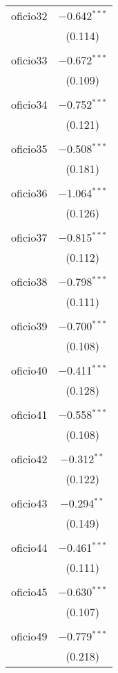 \begin{table}[!htbp]
\begin{tabular}{@{\extracolsep{5pt}}lc}
 oficio32 & $-$0.642$^{***}$ \\ 
  & (0.114) \\ 
  & \\ 
 oficio33 & $-$0.672$^{***}$ \\ 
  & (0.109) \\ 
  & \\ 
 oficio34 & $-$0.752$^{***}$ \\ 
  & (0.121) \\ 
  & \\ 
 oficio35 & $-$0.508$^{***}$ \\ 
  & (0.181) \\ 
  & \\ 
 oficio36 & $-$1.064$^{***}$ \\ 
  & (0.126) \\ 
  & \\ 
 oficio37 & $-$0.815$^{***}$ \\ 
  & (0.112) \\ 
  & \\ 
 oficio38 & $-$0.798$^{***}$ \\ 
  & (0.111) \\ 
  & \\ 
 oficio39 & $-$0.700$^{***}$ \\ 
  & (0.108) \\ 
  & \\ 
 oficio40 & $-$0.411$^{***}$ \\ 
  & (0.128) \\ 
  & \\ 
 oficio41 & $-$0.558$^{***}$ \\ 
  & (0.108) \\ 
  & \\ 
 oficio42 & $-$0.312$^{**}$ \\ 
  & (0.122) \\ 
  & \\ 
 oficio43 & $-$0.294$^{**}$ \\ 
  & (0.149) \\ 
  & \\ 
 oficio44 & $-$0.461$^{***}$ \\ 
  & (0.111) \\ 
  & \\ 
 oficio45 & $-$0.630$^{***}$ \\ 
  & (0.107) \\ 
  & \\ 
 oficio49 & $-$0.779$^{***}$ \\ 
  & (0.218) \\ 

\end{tabular}
\end{table}
